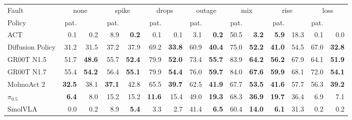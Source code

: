 \begin{tabular}{l rrrrrrrrrrrrrr}
\toprule
Fault & \multicolumn{2}{c}{none} & \multicolumn{2}{c}{spike} & \multicolumn{2}{c}{drops} & \multicolumn{2}{c}{outage} & \multicolumn{2}{c}{mix} & \multicolumn{2}{c}{rise} & \multicolumn{2}{c}{loss} \\
\cmidrule(lr){2-3}\cmidrule(lr){4-5}\cmidrule(lr){6-7}\cmidrule(lr){8-9}\cmidrule(lr){10-11}\cmidrule(lr){12-13}\cmidrule(lr){14-15}
Policy & pat. & \drtc{} & pat. & \drtc{} & pat. & \drtc{} & pat. & \drtc{} & pat. & \drtc{} & pat. & \drtc{} & pat. & \drtc{} \\
\midrule
ACT & 0.1 & 0.2 & 8.9 & \textbf{0.2} & 0.1 & 0.1 & 3.1 & \textbf{0.2} & 50.5 & \textbf{3.2} & \textbf{5.9} & 18.3 & 0.1 & 0.0 \\
Diffusion Policy & 31.2 & 31.5 & 37.2 & 37.9 & 69.2 & \textbf{33.8} & 60.9 & \textbf{40.4} & 75.0 & \textbf{52.2} & \textbf{41.0} & 54.5 & 67.0 & \textbf{32.8} \\
GR00T N1.5 & 51.7 & \textbf{48.6} & 55.7 & \textbf{52.4} & 79.9 & \textbf{52.0} & 73.4 & \textbf{55.7} & 83.9 & \textbf{64.2} & \textbf{56.2} & 67.9 & 64.1 & \textbf{51.9} \\
GR00T N1.7 & 55.4 & \textbf{54.2} & 56.4 & \textbf{55.1} & 79.9 & \textbf{54.4} & 76.0 & \textbf{59.7} & 84.0 & \textbf{67.6} & \textbf{59.9} & 68.1 & 72.0 & \textbf{54.1} \\
MolmoAct 2 & \textbf{32.5} & 38.1 & \textbf{37.1} & 42.8 & 65.5 & \textbf{39.7} & 62.5 & \textbf{41.9} & 67.7 & \textbf{53.5} & \textbf{41.6} & 57.7 & 56.3 & \textbf{39.2} \\
$\pi_{0.5}$ & \textbf{6.4} & 8.0 & 15.2 & 15.2 & \textbf{11.6} & 15.4 & 49.0 & \textbf{19.3} & 68.3 & \textbf{36.9} & \textbf{19.7} & 36.4 & 6.9 & 7.1 \\
SmolVLA & 0.0 & 0.2 & 8.9 & \textbf{5.4} & 3.3 & 2.7 & 41.4 & \textbf{6.5} & 60.4 & \textbf{14.0} & \textbf{6.1} & 31.3 & 0.2 & 0.2 \\
\bottomrule
\end{tabular}
